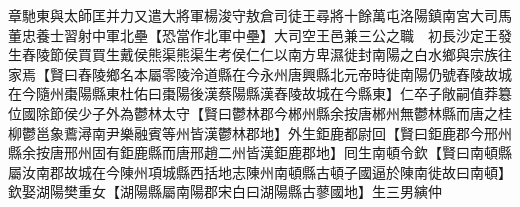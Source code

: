 章馳東與太師匡并力又遣大將軍楊浚守敖倉司徒王尋將十餘萬屯洛陽鎮南宮大司馬董忠養士習射中軍北壘【恐當作北軍中壘】大司空王邑兼三公之職　初長沙定王發生舂陵節侯買買生戴侯熊渠熊渠生考侯仁仁以南方卑濕徙封南陽之白水鄉與宗族往家焉【賢曰舂陵鄉名本屬零陵泠道縣在今永州唐興縣北元帝時徙南陽仍號舂陵故城在今隨州棗陽縣東杜佑曰棗陽後漢蔡陽縣漢舂陵故城在今縣東】仁卒子敞嗣值莽簒位國除節侯少子外為鬱林太守【賢曰鬱林郡今郴州縣余按唐郴州無鬱林縣而唐之桂柳鬱邕象鷰潯南尹樂融賓等州皆漢鬱林郡地】外生鉅鹿都尉回【賢曰鉅鹿郡今邢州縣余按唐邢州固有鉅鹿縣而唐邢趙二州皆漢鉅鹿郡地】囘生南頓令欽【賢曰南頓縣屬汝南郡故城在今陳州項城縣西括地志陳州南頓縣古頓子國逼於陳南徙故曰南頓】欽娶湖陽樊重女【湖陽縣屬南陽郡宋白曰湖陽縣古蓼國地】生三男縯仲